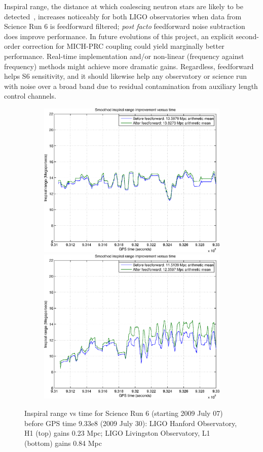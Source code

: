 Inspiral range, the distance at which coalescing neutron stars are likely to be detected~\cite{FinnInspiral1993}, increases noticeably for both LIGO observatories when data from Science Run 6 is feedforward filtered; \textit{post facto} feedforward noise subtraction does improve performance. In future evolutions of this project, an explicit second-order correction for MICH-PRC coupling could yield marginally better performance. Real-time implementation and/or non-linear (frequency against frequency) methods might achieve more dramatic gains. Regardless, feedforward helps S6 sensitivity, and it should likewise help any observatory or science run with noise over a broad band due to residual contamination from auxiliary length control channels.

\begin{figure}
\begin{center}
\includegraphics[height=75mm, width=150mm]{figure14a.eps}
\includegraphics[height=75mm, width=150mm]{figure14b.eps}
\caption{Inspiral range vs time for Science Run 6 (starting 2009 July 07) before GPS time 9.33e8 (2009 July 30):
LIGO Hanford Observatory, H1 (top) gains 0.23 Mpc; LIGO Livingston Observatory, L1 (bottom) gains 0.84 Mpc}
\label{S6inspiralRange}
\end{center}
\end{figure}
